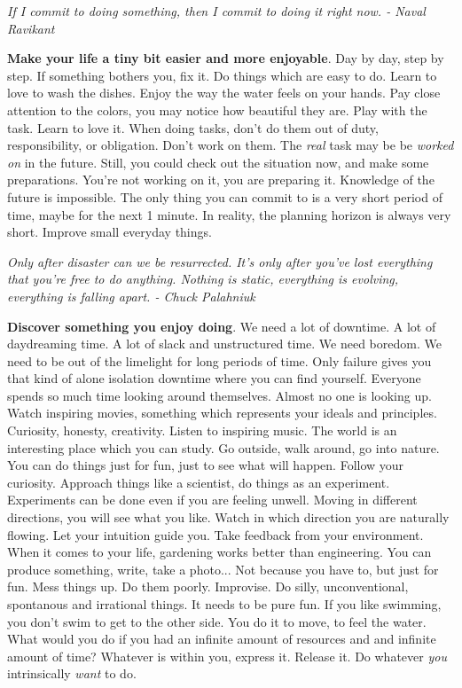 \documentclass[a4paper,hidelinks]{article}
\begin{document}
\newpage

\begin{center}
\textit{If I commit to doing something, then I commit to doing it right now. - Naval Ravikant}
\end{center}

\textbf{Make your life a tiny bit easier and more enjoyable}.
Day by day, step by step.
If something bothers you, fix it.
Do things which are easy to do.
Learn to love to wash the dishes.
Enjoy the way the water feels on your hands.
Pay close attention to the colors, you may notice how beautiful they are.
Play with the task.
Learn to love it.
When doing tasks, don't do them out of duty, responsibility, or obligation.
Don't work on them.
The \textit{real} task may be be \textit{worked on} in the future.
Still, you could check out the situation now, and make some preparations.
You're not working on it, you are preparing it.
Knowledge of the future is impossible.
The only thing you can commit to is a very short period of time, maybe for the next 1 minute.
In reality, the planning horizon is always very short.
Improve small everyday things.

\newpage

\begin{center}
\textit{Only after disaster can we be resurrected. It's only after you've lost everything that you're free to do anything. Nothing is static, everything is evolving, everything is falling apart. - Chuck Palahniuk}
\end{center}

\textbf{Discover something you enjoy doing}.
We need a lot of downtime.
A lot of daydreaming time.
A lot of slack and unstructured time.
We need boredom.
We need to be out of the limelight for long periods of time.
Only failure gives you that kind of alone isolation downtime where you can find yourself.
Everyone spends so much time looking around themselves.
Almost no one is looking up.
Watch inspiring movies, something which represents your ideals and principles.
Curiosity, honesty, creativity.
Listen to inspiring music.
The world is an interesting place which you can study.
Go outside, walk around, go into nature.
You can do things just for fun, just to see what will happen.
Follow your curiosity.
Approach things like a scientist, do things as an experiment.
Experiments can be done even if you are feeling unwell.
Moving in different directions, you will see what you like.
Watch in which direction you are naturally flowing.
Let your intuition guide you.
Take feedback from your environment.
When it comes to your life, gardening works better than engineering.
You can produce something, write, take a photo...
Not because you have to, but just for fun.
Mess things up.
Do them poorly.
Improvise.
Do silly, unconventional, spontanous and irrational things.
It needs to be pure fun.
If you like swimming, you don't swim to get to the other side.
You do it to move, to feel the water.
What would you do if you had an infinite amount of resources and and infinite amount of time?
Whatever is within you, express it.
Release it.
Do whatever \textit{you} intrinsically \textit{want} to do.
\end{document}
